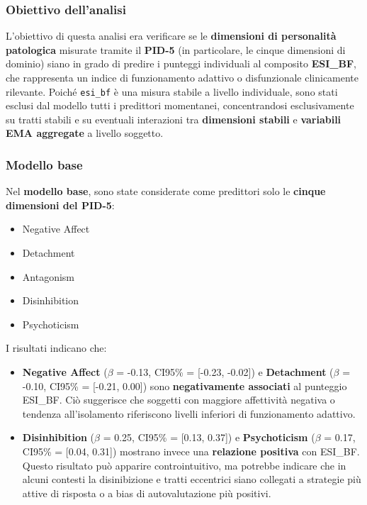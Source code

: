 \documentclass[
  11pt,
  a4paper,
  onecolumn]{article}
\providecommand{\tightlist}{%
  \setlength{\itemsep}{0pt}\setlength{\parskip}{0pt}}
\begin{document}
\subsubsection{Obiettivo dell'analisi}\label{obiettivo-dellanalisi}

L'obiettivo di questa analisi era verificare se le \textbf{dimensioni di
personalità patologica} misurate tramite il \textbf{PID-5} (in
particolare, le cinque dimensioni di dominio) siano in grado di predire
i punteggi individuali al composito \textbf{ESI\_BF}, che rappresenta un
indice di funzionamento adattivo o disfunzionale clinicamente rilevante.
Poiché \texttt{esi\_bf} è una misura stabile a livello individuale, sono
stati esclusi dal modello tutti i predittori momentanei, concentrandosi
esclusivamente su tratti stabili e su eventuali interazioni tra
\textbf{dimensioni stabili} e \textbf{variabili EMA aggregate} a livello
soggetto.

\subsubsection{Modello base}\label{modello-base}

Nel \textbf{modello base}, sono state considerate come predittori solo
le \textbf{cinque dimensioni del PID-5}:

\begin{itemize}
\tightlist
\item
  Negative Affect
\item
  Detachment
\item
  Antagonism
\item
  Disinhibition
\item
  Psychoticism
\end{itemize}

I risultati indicano che:

\begin{itemize}
\tightlist
\item
  \textbf{Negative Affect} (\(\beta\) = -0.13, CI95\% = {[}-0.23,
  -0.02{]}) e \textbf{Detachment} (\(\beta\) = -0.10, CI95\% = {[}-0.21,
  0.00{]}) sono \textbf{negativamente associati} al punteggio ESI\_BF.
  Ciò suggerisce che soggetti con maggiore affettività negativa o
  tendenza all'isolamento riferiscono livelli inferiori di funzionamento
  adattivo.
\item
  \textbf{Disinhibition} (\(\beta\) = 0.25, CI95\% = {[}0.13, 0.37{]}) e
  \textbf{Psychoticism} (\(\beta\) = 0.17, CI95\% = {[}0.04, 0.31{]})
  mostrano invece una \textbf{relazione positiva} con ESI\_BF. Questo
  risultato può apparire controintuitivo, ma potrebbe indicare che in
  alcuni contesti la disinibizione e tratti eccentrici siano collegati a
  strategie più attive di risposta o a bias di autovalutazione più
  positivi.
\end{itemize}
\end{document}
